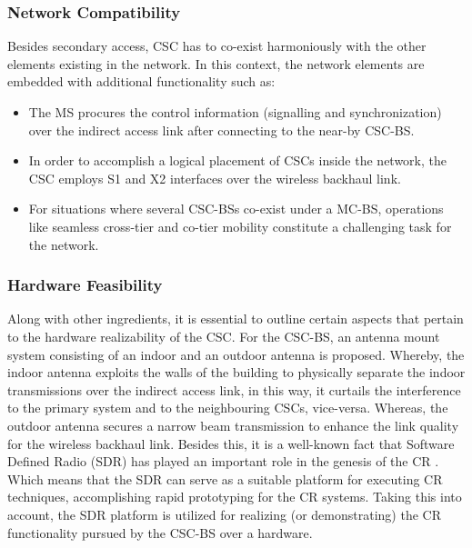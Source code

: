 \subsubsection*{Network Compatibility}
Besides secondary access, CSC has to co-exist harmoniously with the other elements existing in the network. In this context, the network elements are embedded with additional functionality such as:
\begin{itemize}
\item The MS procures the control information (signalling and synchronization) over the indirect access link after connecting to the near-by CSC-BS.
\item In order to accomplish a logical placement of CSCs inside the network, the CSC employs S1 and X2 interfaces over the wireless backhaul link.
\item For situations where several CSC-BSs co-exist under a MC-BS, operations like seamless cross-tier and co-tier mobility constitute a challenging task for the network.
\end{itemize}


\subsubsection*{Hardware Feasibility}
Along with other ingredients, it is essential to outline certain aspects that pertain to the hardware realizability of the CSC. For the CSC-BS, an antenna mount system consisting of an indoor and an outdoor antenna is proposed. Whereby, the indoor antenna exploits the walls of the building to physically separate the indoor transmissions over the indirect access link, in this way, it curtails the interference to the primary system and to the neighbouring CSCs, vice-versa. Whereas, the outdoor antenna secures a narrow beam transmission to enhance the link quality for the wireless backhaul link. Besides this, it is a well-known fact that Software Defined Radio (SDR) has played an important role in the genesis of the CR \cite{Jondral05}. Which means that the SDR can serve as a suitable platform for executing CR techniques, accomplishing rapid prototyping for the CR systems. Taking this into account, the SDR platform is utilized for realizing (or demonstrating) the CR functionality pursued by the CSC-BS over a hardware.


